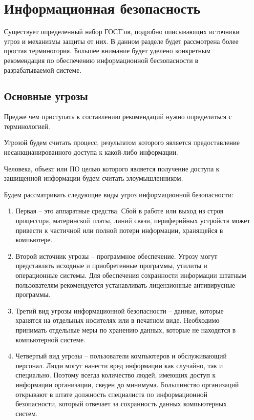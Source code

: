 \newpage
\chapter{Информационная безопасность}
Существует определенный набор ГОСТ’ов, подробно описывающих источники угроз и
механизмы защиты от них. В данном разделе будет рассмотрена более простая
терминогория. Большее внимание будет уделено конкретным рекомендация по
обеспечению информационной бесзопасности в разрабатываемой системе.

\section{Основные угрозы}
Предже чем приступать к составлению рекомендаций нужно определиться с
терминологией.

Угрозой будем считать процесс, результатом которого является предоставление
несанкцианированного доступа к какой-либо информации.

Человека, объект или ПО целью которого является получение доступа к зашищенной
информации будем считать злоумышленником.

Будем рассматривать следующие виды угроз информационной безопасности:

\begin{enumerate}
  \item Первая – это аппаратные средства. Сбой в работе или выход из строя процессора, материнской платы, линий связи, периферийных устройств может привести к частичной или полной потери информации, хранящейся в компьютере.
  \item Второй источник угрозы – программное обеспечение. Угрозу могут
представлять исходные и приобретенные программы, утилиты и операционные системы. Для обеспечения сохранности информации штатным пользователям рекомендуется устанавливать лицензионные антивирусные программы.
  \item Третий вид угрозы информационной безопасности – данные, которые хранятся
на отдельных носителях или в печатном виде. Необходимо принимать отдельные меры по хранению данных, которые не находятся в компьютерной системе.
  \item Четвертый вид угрозы – пользователи компьютеров и обслуживающий
персонал. Люди могут нанести вред информации как случайно, так и специально. Поэтому всегда количество людей, имеющих доступ к информации организации, сведен до минимума. Большинство организаций открывают в штате должность специалиста по информационной безопасности, который отвечает за сохранность данных компьютерных систем.
\end{enumerate}

